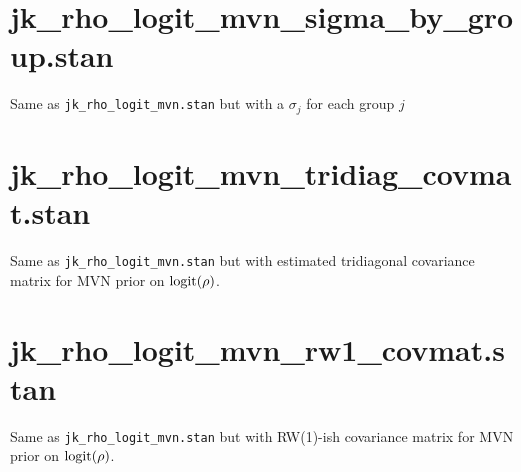 \documentclass[11pt, oneside]{article}
\begin{document}
\section*{jk\_rho\_logit\_mvn\_sigma\_by\_group.stan}

Same as {\tt jk\_rho\_logit\_mvn.stan} but with a $\sigma_j$ for each group $j$


\section*{jk\_rho\_logit\_mvn\_tridiag_covmat.stan}

Same as {\tt jk\_rho\_logit\_mvn.stan} but with estimated tridiagonal covariance matrix for MVN prior on $\rm{logit}(\rho)$.  


\section*{jk\_rho\_logit\_mvn\_rw1_covmat.stan}

Same as {\tt jk\_rho\_logit\_mvn.stan} but with RW(1)-ish covariance matrix for MVN prior on $\rm{logit}(\rho)$.  
\end{document}
